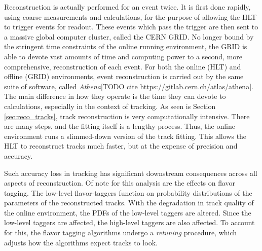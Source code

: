         Reconstruction is actually performed for an event twice.
        It is first done rapidly, using coarse measurements and calculations,
            for the purpose of allowing the HLT to trigger events for readout.
        These events which pass the trigger are then sent to a massive global computer cluster, called the CERN GRID.
        No longer bound by the stringent time constraints of the online running environment,
            the GRID is able to devote vast amounts of time and computing power to a second, 
            more comprehensive, reconstruction of each event.
        For both the online (HLT) and offline (GRID) environments, event reconstruction is carried out by the same suite of software,
            called \textit{Athena}[TODO cite https://gitlab.cern.ch/atlas/athena].
        The main difference in how they operate is the time they can devote to calculations, especially in the context of tracking.
        As seen is Section \ref{sec:reco_tracks}, track reconstruction is very computationally intensive.
        There are many steps, and the fitting itself is a lengthy process.
        Thus, the online environment runs a slimmed-down version of the track fitting.
        This allows the HLT to reconstruct tracks much faster, but at the expense of precision and accuracy.

        Such accuracy loss in tracking has significant downstream consequences across all aspects of reconstruction.
        Of note for this analysis are the effects on flavor tagging.
        The low-level flavor-taggers function on probability distributions of the parameters of the reconstructed tracks.
        With the degradation in track quality of the online environment, the PDFs of the low-level taggers are altered.
        Since the low-level taggers are affected, the high-level taggers are also affected.
        To account for this, the flavor tagging algorithms undergo a \textit{retuning} procedure, 
            which adjusts how the algorithms expect tracks to look.

